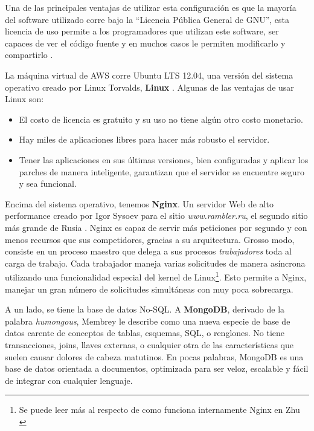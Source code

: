 Una de las principales ventajas de utilizar esta configuración es que la mayoría del software utilizado corre bajo la ``Licencia Pública General de GNU'', esta licencia de uso permite a los programadores que utilizan este software, ser capaces de ver el código fuente y en muchos casos le permiten modificarlo y compartirlo \cite{lozano2008software}.

La máquina virtual de AWS corre Ubuntu LTS 12.04, una versión del sistema operativo creado por Linux Torvalds, \textbf{Linux} \cite{torvalds2001just}. Algunas de las ventajas de usar Linux son:
		\begin{itemize}
 			\item El costo de licencia es gratuito y su uso no tiene algún otro costo monetario.
 			\item Hay miles de aplicaciones libres para hacer más robusto el servidor.
 			\item Tener las aplicaciones en sus últimas versiones, bien configuradas y aplicar los parches de manera inteligente, garantizan que el servidor se encuentre seguro y sea funcional.
 		\end{itemize}
		
Encima del sistema operativo, tenemos \textbf{Nginx}. Un servidor Web de alto performance creado por Igor Sysoev para el sitio \emph{www.rambler.ru}, el segundo sitio más grande de Rusia \cite{reese2008nginx}. Nginx es capaz de servir más peticiones por segundo y con menos recursos que sus competidores, gracias a su arquitectura. Grosso modo, consiste en un proceso maestro que delega a sus procesos \emph{trabajadores} toda al carga de trabajo. Cada trabajador maneja varias solicitudes de manera asíncrona utilizando una funcionalidad especial del kernel de Linux\footnote{Se puede leer más al respecto de como funciona internamente Nginx en Zhu \cite{zhu2010nginx}}. Esto permite a Nginx, manejar un gran número de solicitudes simultáneas  con muy poca sobrecarga.

A un lado, se tiene la base de datos No-SQL. A \textbf{MongoDB}, derivado de la palabra \emph{humongous}, Membrey \cite{membrey2010definitive} le describe como una nueva especie de base de datos carente de conceptos de tablas, esquemas, SQL, o renglones. No tiene transacciones, joins, llaves externas, o cualquier otra de las características que suelen causar dolores de cabeza matutinos. En pocas palabras, MongoDB es una base de datos orientada a documentos, optimizada para ser veloz, escalable y fácil de integrar con cualquier lenguaje.

